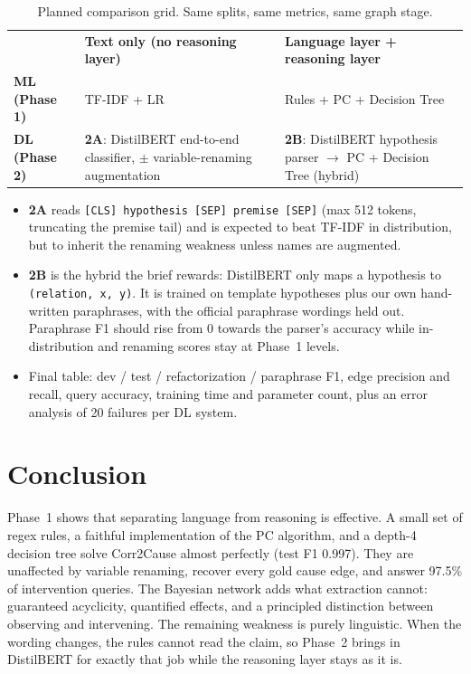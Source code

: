 \documentclass[11pt,a4paper]{article}
\newcommand{\thead}[1]{\leavevmode\sffamily\bfseries\color{white}#1}
\newcommand{\headrow}{\rowcolor{ink}}
\newcommand{\code}[1]{\texttt{\small\color{neural!80!black}#1}}
\begin{document}
\begin{table}[!htbp]
\centering\small
\caption{Planned comparison grid. Same splits, same metrics, same graph stage.}
\label{tab:phase2}
\begin{tabularx}{\linewidth}{@{}l>{\raggedright}X>{\raggedright\arraybackslash}X@{}}
\headrow & \thead{Text only (no reasoning layer)} & \thead{Language layer + reasoning layer} \\
\textbf{ML (Phase 1)} & TF-IDF + LR & Rules + PC + Decision Tree \\
\rowcolor{neuralT}\textbf{DL (Phase 2)} & \textbf{2A}: DistilBERT end-to-end classifier, $\pm$ variable-renaming augmentation &
  \textbf{2B}: DistilBERT hypothesis parser $\rightarrow$ PC + Decision Tree (hybrid) \\
\end{tabularx}
\end{table}

\begin{itemize}
  \item \textbf{2A} reads \code{[CLS] hypothesis [SEP] premise [SEP]} (max 512 tokens, truncating the premise tail) and is
        expected to beat TF-IDF in distribution, but to inherit the renaming weakness unless names are augmented.
  \item \textbf{2B} is the hybrid the brief rewards: DistilBERT only maps a hypothesis to \code{(relation, x, y)}. It is trained
        on template hypotheses plus our own hand-written paraphrases, with the official paraphrase wordings held out. Paraphrase
        F1 should rise from 0 towards the parser's accuracy while in-distribution and renaming scores stay at Phase~1 levels.
  \item Final table: dev / test / refactorization / paraphrase F1, edge precision and recall, query accuracy, training time and
        parameter count, plus an error analysis of 20 failures per DL system.
\end{itemize}

\section{Conclusion}
Phase~1 shows that separating language from reasoning is effective. A small set of regex rules, a faithful
implementation of the PC algorithm, and a depth-4 decision tree solve Corr2Cause almost perfectly (test F1 0.997). They
are unaffected by variable renaming, recover every gold cause edge, and answer 97.5\% of intervention queries. The
Bayesian network adds what extraction cannot: guaranteed acyclicity, quantified effects, and a principled distinction
between observing and intervening. The remaining weakness is purely linguistic. When the wording changes, the rules
cannot read the claim, so Phase~2 brings in DistilBERT for exactly that job while the reasoning layer stays as it is.
\end{document}
